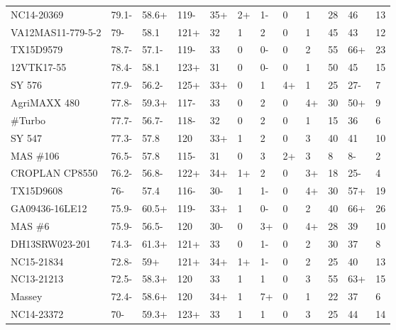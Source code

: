\documentclass[12pt, letterpaper]{article}
\begin{document}
\begin{landscape}
\begin{ThreePartTable}
\begin{longtable}{llllllllllll}
  NC14-20369 & 79.1- & 58.6+ & 119- & 35+ & 2+ & 1- & 0 & 1 & 28 & 46 & 13 \\ 
  VA12MAS11-779-5-2 & 79- & 58.1 & 121+ & 32 & 1 & 2 & 0 & 1 & 45 & 43 & 12 \\ 
  TX15D9579 & 78.7- & 57.1- & 119- & 33 & 0 & 0- & 0 & 2 & 55 & 66+ & 23 \\ 
  12VTK17-55 & 78.4- & 58.1 & 123+ & 31 & 0 & 0- & 0 & 1 & 50 & 45 & 15 \\ 
  SY 576 & 77.9- & 56.2- & 125+ & 33+ & 0 & 1 & 4+ & 1 & 25 & 27- & 7 \\ 
  AgriMAXX 480 & 77.8- & 59.3+ & 117- & 33 & 0 & 2 & 0 & 4+ & 30 & 50+ & 9 \\ 
  \#Turbo & 77.7- & 56.7- & 118- & 32 & 0 & 2 & 0 & 1 & 15 & 36 & 6 \\ 
  SY 547 & 77.3- & 57.8 & 120 & 33+ & 1 & 2 & 0 & 3 & 40 & 41 & 10 \\ 
  MAS \#106 & 76.5- & 57.8 & 115- & 31 & 0 & 3 & 2+ & 3 & 8 & 8- & 2 \\ 
  CROPLAN CP8550 & 76.2- & 56.8- & 122+ & 34+ & 1+ & 2 & 0 & 3+ & 18 & 25- & 4 \\ 
  TX15D9608 & 76- & 57.4 & 116- & 30- & 1 & 1- & 0 & 4+ & 30 & 57+ & 19 \\ 
  GA09436-16LE12 & 75.9- & 60.5+ & 119- & 33+ & 1 & 0- & 0 & 2 & 40 & 66+ & 26 \\ 
  MAS \#6 & 75.9- & 56.5- & 120 & 30- & 0 & 3+ & 0 & 4+ & 28 & 39 & 10 \\ 
  DH13SRW023-201 & 74.3- & 61.3+ & 121+ & 33 & 0 & 1- & 0 & 2 & 30 & 37 & 8 \\ 
  NC15-21834 & 72.8- & 59+ & 121+ & 34+ & 1+ & 1- & 0 & 2 & 25 & 40 & 13 \\ 
  NC13-21213 & 72.5- & 58.3+ & 120 & 33 & 1 & 1 & 0 & 3 & 55 & 63+ & 15 \\ 
  Massey & 72.4- & 58.6+ & 120 & 34+ & 1 & 7+ & 0 & 1 & 22 & 37 & 6 \\ 
  NC14-23372 & 70- & 59.3+ & 123+ & 33 & 1 & 1 & 0 & 3 & 25 & 44 & 14 \\ 
\end{longtable}
\end{ThreePartTable}


\end{landscape}
\end{document}

